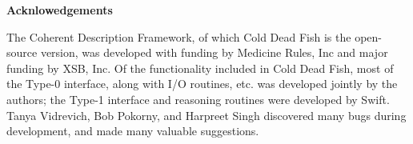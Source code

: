 

\begin{center}
{\Large {\bf Acknlowedgements } }
\end{center}

The Coherent Description Framework, of which Cold Dead Fish is the
open-source version, was developed with funding by Medicine Rules, Inc
and major funding by XSB, Inc.  Of the functionality included in Cold
Dead Fish, most of the Type-0 interface, along with I/O routines,
etc. was developed jointly by the authors; the Type-1 interface and
reasoning routines were developed by Swift.  Tanya Vidrevich, Bob
Pokorny, and Harpreet Singh discovered many bugs during development,
and made many valuable suggestions.
